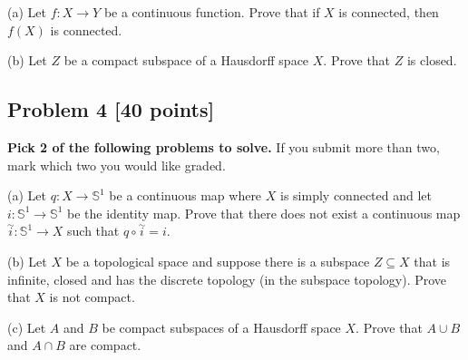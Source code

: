 \documentclass{article}
\begin{document}
\vspace{1cm}

(a) Let $f: X \rightarrow Y$ be a continuous function. Prove that if $X$ is connected, then $f(X)$ is connected.

\vspace{10cm}

(b) Let $Z$ be a compact subspace of a Hausdorff space $X$. Prove that $Z$ is closed.


\newpage
\subsection*{Problem 4 [40 points]}

\textbf{Pick 2 of the following problems to solve.} If you submit more than two, mark which two you would like graded.

\vspace{1cm}

(a) Let $q: X \rightarrow \mathbb{S}^1$ be a continuous map where $X$ is simply connected and let $i: \mathbb{S}^1 \rightarrow \mathbb{S}^1$ be the identity map. Prove that there does not exist a continuous map $\overset{\sim}{i}: \mathbb{S}^1 \rightarrow X$ such that $q \circ \overset{\sim}{i} = i$. 

\vspace{1cm}

(b) Let $X$ be a topological space and suppose there is a subspace $Z \subseteq X$ that is infinite, closed and has the discrete topology (in the subspace topology). Prove that $X$ is not compact.

\vspace{1cm}

(c) Let $A$ and $B$ be compact subspaces of a Hausdorff space $X$. Prove that $A \cup B$ and $A \cap B$ are compact.
\end{document}
